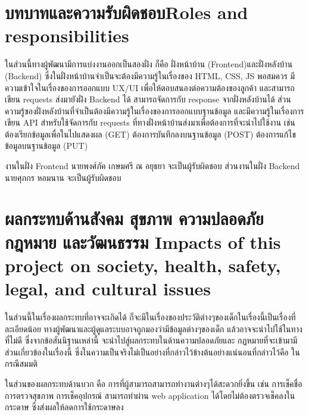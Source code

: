 \section{\ifcpe บทบาทและความรับผิดชอบ\else Roles and responsibilities\fi}
ในส่วนนี้ทางผู้พัฒนามีการแบ่งงานออกเป็นสองฝั่ง ก็คือ ฝั่งหน้าบ้าน 
(Frontend)และฝั่งหลังบ้าน (Backend) ซึ่งในฝั่งหน้าบ้านจำเป็นจะต้องมีความรู้ในเรื่องของ HTML, CSS, JS พอสมควร มีความเข้าใจในเรื่องของการออกแบบ UX/UI เพื่อให้ตอบสนองต่อความต้องของลูกค้า และสามารถเขียน requests ส่งมายังฝั่ง Backend ได้ สามารถจัดการกับ response จากฝั่งหลังบ้านได้ ส่วนความรู้ของฝั่งหลังบ้านที่จำเป็นต้องมีความรู้ในเรื่องของการออกแบบฐานข้อมูล  และมีความรู้ในเรื่องการเขียน API  สำหรับใช้จัดการกับ requests ที่ทางฝั่งหน้าบ้านส่งมาเพื่อต้องการที่จะนำไปใช้งาน เช่น ต้องเรียกข้อมูลเพื่อในไปแสดงผล (GET)
ต้องการบันทึกลงบนฐานข้อมูล (POST) ต้องการแก้ไขข้อมูลบนฐานข้อมูล (PUT)

งานในฝั่ง Frontend นายพงศ์ภัค เกษมศรี ณ อยุธยา จะเป็นผู้รับผิดชอบ 
ส่วนงานในฝั่ง Backend นายศุภกร หอมนาน  จะเป็นผู้รับผิดชอบ


\section{\ifcpe%
ผลกระทบด้านสังคม สุขภาพ ความปลอดภัย กฎหมาย และวัฒนธรรม
\else%
Impacts of this project on society, health, safety, legal, and cultural issues
\fi}

ในส่วนนี้ในเรื่องผลกระทบที่อาจจะเกิดได้ ก็จะมีในเรื่องของประวัติต่างๆของเด็กในเรื่องนี้เป็นเรื่องที่ละเอียดน้อย ทางผู้พัฒนาและผู้ดูแลระบบอาจถูกมองว่ามีข้อมูลต่างๆของเด็ก แล้วอาจจะนำไปใช้ในทางที่ไม่ดี  ซึ่งจากข้อสันนิฐานเหล่านี้ จะนำไปสู่ผลกระทบในด้านความปลอดภัยและ กฏหมายที่จะเข้ามามีส่วนเกี่ยวข้องในเรื่องนี้ ซึ่งในความเป็นจริงไม่เป็นอย่างที่กล่าวไว้ข้างต้นอย่างแน่นอนที่กล่าวไว้คือ ในกรณีสมมติ 

ในส่วนของผลกระทบด้านบวก คือ การที่ผู้สามารถสามารถทำงานต่างๆได้สะดวกยิ่งขึ้น เช่น การเช็คชื่อ การตรวจสุขภาพ การเช็คอุปกรณ์ สามารถทำผ่าน web application ได้โดยไม่ต้องตรวจเช็คลงในกระดาษ ซึ่งส่งผลให้ลดการใช้กระดาษลง

